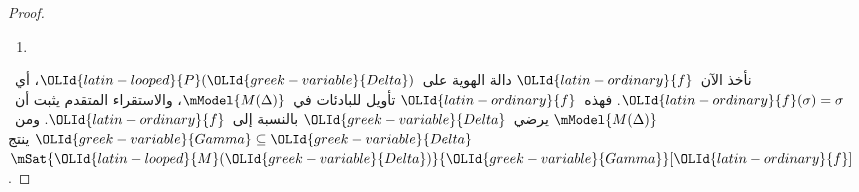 \documentclass[../../../include/open-logic-section]{subfiles}
\begin{document}
\begin{proof}
\begin{enumerate}
{{      وإذا كان $\sFmla{\False}{\indfrm}[\sigma] \in \OLId{greek-variable}{Delta}$، فلبعض
      $\sigma.\OLId{latin-ordinary}{n}$ يكون $\sFmla{\False}{!B}[\sigma.\OLId{latin-ordinary}{n}] \in \OLId{greek-variable}{Delta}$ لأن
      الفرع تام. وبفرض الاستقراء،
      $\mSat/{\OLId{latin-looped}{M}(\OLId{greek-variable}{Delta})}{!B}[\sigma.\OLId{latin-ordinary}{n}]$. ولأن
      $\OLId{latin-looped}{R}\sigma(\sigma.\OLId{latin-ordinary}{n})$، توجد~$\sigma'$ بحيث
      $\mSat/{\OLId{latin-looped}{M}(\OLId{greek-variable}{Delta})}{!B}[\sigma']$. ومن ثم
      $\mSat/{\OLId{latin-looped}{M}(\OLId{greek-variable}{Delta})}{\indfrm}[\sigma]$.}}
  \item {}
\end{enumerate}
نأخذ الآن~$\OLId{latin-ordinary}{f}$ دالة الهوية على~$\OLId{latin-looped}{P}(\OLId{greek-variable}{Delta})$، أي~$\OLId{latin-ordinary}{f}(\sigma)=\sigma$.
فهذه~$\OLId{latin-ordinary}{f}$ تأويل للبادئات في~$\mModel{M(\Delta)}$، والاستقراء المتقدم
يثبت أن~$\mModel{M(\Delta)}$ يرضي~$\OLId{greek-variable}{Delta}$ بالنسبة إلى~$\OLId{latin-ordinary}{f}$.
ومن~$\OLId{greek-variable}{Gamma} \subseteq \OLId{greek-variable}{Delta}$ ينتج~$\mSat{\OLId{latin-looped}{M}(\OLId{greek-variable}{Delta})}{\OLId{greek-variable}{Gamma}}[\OLId{latin-ordinary}{f}]$.
\end{proof}
\end{document}
